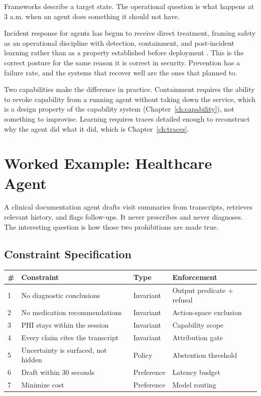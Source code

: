 Frameworks describe a target state. The operational question is what happens at
3 a.m. when an agent does something it should not have.

Incident response for agents has begun to receive direct treatment, framing safety
as an operational discipline with detection, containment, and post-incident
learning rather than as a property established before deployment
\cite{air2026}. This is the correct posture for the same reason it is correct in
security. Prevention has a failure rate, and the systems that recover well are the
ones that planned to.

Two capabilities make the difference in practice. Containment requires the ability
to revoke capability from a running agent without taking down the service, which
is a design property of the capability system (Chapter~\ref{ch:capability}), not
something to improvise. Learning requires traces detailed enough to reconstruct
why the agent did what it did, which is Chapter~\ref{ch:traces}.

\section{Worked Example: Healthcare Agent}

A clinical documentation agent drafts visit summaries from transcripts, retrieves
relevant history, and flags follow-ups. It never prescribes and never diagnoses.
The interesting question is how those two prohibitions are made true.

\subsection{Constraint Specification}

\begin{center}
\begin{tabular}{llll}
\toprule
\# & Constraint & Type & Enforcement \\
\midrule
1 & No diagnostic conclusions & Invariant & Output predicate + refusal \\
2 & No medication recommendations & Invariant & Action-space exclusion \\
3 & PHI stays within the session & Invariant & Capability scope \\
4 & Every claim cites the transcript & Invariant & Attribution gate \\
5 & Uncertainty is surfaced, not hidden & Policy & Abstention threshold \\
6 & Draft within 30 seconds & Preference & Latency budget \\
7 & Minimize cost & Preference & Model routing \\
\bottomrule
\end{tabular}
\end{center}

